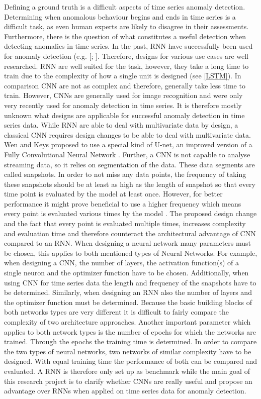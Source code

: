 Defining a ground truth is a difficult aspects of time series anomaly detection. Determining when anomalous behaviour begins and ends in time series is a difficult task, as even human experts are likely to disagree in their assessments. Furthermore, there is the question of what constitutes a useful detection when detecting anomalies in time series.
In the past, RNN have successfully been used for anomaly detection (e.g. [\parencite{Malhotra2015}; \parencite{Fan2016}]. Therefore, designs for various use cases are well researched. RNN are well suited for the task, however, they take a long time to train due to the complexity of how a single unit is designed (see \ref{LSTM}). In comparison CNN are not as complex and therefore, generally take less time to train. However, CNNs are generally used for image recognition and were only very recently used for anomaly detection in time series. It is therefore mostly unknown what designs are applicable for successful anomaly detection in time series data. %
While RNN are able to deal with multivariate data by design, a classical CNN requires design changes to be able to deal with multivariate data. Wen and Keys \parencite*{Wen2019} proposed to use a special kind of U-net, an improved version of a Fully Convolutional Neural Network \parencite{Ronneberger2015}.
Further, a CNN is not capable to analyse streaming data, so it relies on segmentation of the data. These data segments are called snapshots. In order to not miss any data points, the frequency of taking these snapshots should be at least as high as the length of snapshot so that every time point is evaluated by the model at least once. However, for better performance it might prove beneficial to use a higher frequency which means every point is evaluated various times by the model \parencite{Wen2019}. The proposed design change and the fact that every point is evaluated multiple times, increases complexity and evaluation time and therefore counteract the architectural advantage of CNN compared to an RNN. 
When designing a neural network many parameters must be chosen, this applies to both mentioned types of Neural Networks. For example, when designing a CNN, the number of layers, the activation function(s) of a single neuron and the optimizer function have to be chosen. Additionally, when using CNN for time series data the length and frequency of the snapshots have to be determined. Similarly, when designing an RNN also the number of layers and the optimizer function must be determined. Because the basic building blocks of both networks types are very different it is difficult to fairly compare the complexity of two architecture approaches. Another important parameter which applies to both network types is the number of epochs for which the networks are trained. Through the epochs the training time is determined. In order to compare the two types of neural networks, two networks of similar complexity have to be designed. With equal training time the performance of both can be compared and evaluated. A RNN is therefore only set up as benchmark while the main goal of this research project is to clarify whether CNNs are really useful and propose an advantage over RNNs when applied on time series data for anomaly detection.


